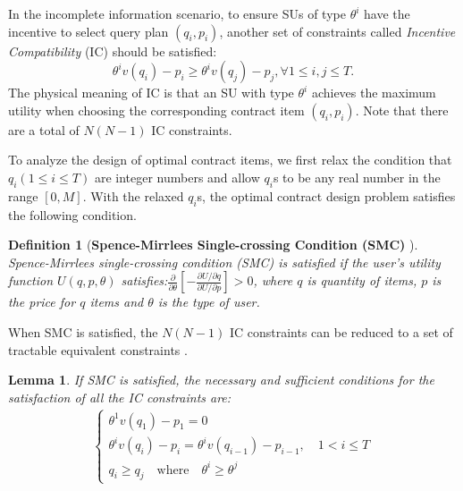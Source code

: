 \documentclass[journal]{IEEEtran}
\newtheorem{lemma}[theorem]{Lemma}
\newtheorem{definition}{Definition}
\begin{document}
In the incomplete information scenario, to ensure SUs of type $\theta^i$ have the incentive to select query plan $(q_i, p_i)$, another set of constraints called \emph{Incentive Compatibility} (IC) should be satisfied:
\begin{equation}
\theta^iv(q_i)-p_i\geq \theta^iv(q_j)-p_j, \forall 1\leq i,j\leq T.
\end{equation}
The physical meaning of IC is that an SU with type $\theta^i$ achieves the maximum utility when choosing the corresponding contract item $(q_i, p_i)$. Note that there are a total of $N(N-1)$ IC constraints.

To analyze the design of optimal contract items, we first relax the condition that $q_i (1\leq i\leq T)$ are integer numbers and allow $q_i$s to be any real number in the range $[0, M]$.
With the relaxed $q_i$s, the optimal contract design problem satisfies the following condition.
\begin{definition}[\textbf{Spence-Mirrlees Single-crossing Condition (SMC)} \cite{contract_book}]
Spence-Mirrlees single-crossing condition (SMC) is satisfied if the user's utility function $U(q, p, \theta)$ satisfies:$\frac{\partial}{\partial\theta}\left[-\frac{\partial U/\partial q}{\partial U/\partial p}\right]>0$, where $q$ is quantity of items, $p$ is the price for $q$ items and $\theta$ is the type of user.
\end{definition}
When SMC is satisfied, the $N(N-1)$ IC constraints can be reduced to a set of tractable equivalent constraints \cite{contract_book}.
\begin{lemma}
\label{lemma:IC_incomplete}
If SMC is satisfied, the necessary and sufficient conditions for the satisfaction of all the IC constraints are:
\begin{eqnarray}
\label{eqn:monotone_q}
\left\{
\begin{array}{l}
\theta^1v(q_1)-p_1=0 \\
\theta^iv(q_i)-p_i=\theta^iv(q_{i-1})-p_{i-1}, \quad 1 < i \leq T\\
q_i\geq q_j \quad \textrm{where} \quad \theta^i\geq\theta^j
\end{array}
\right.
\end{eqnarray}
\end{lemma}
\end{document}
